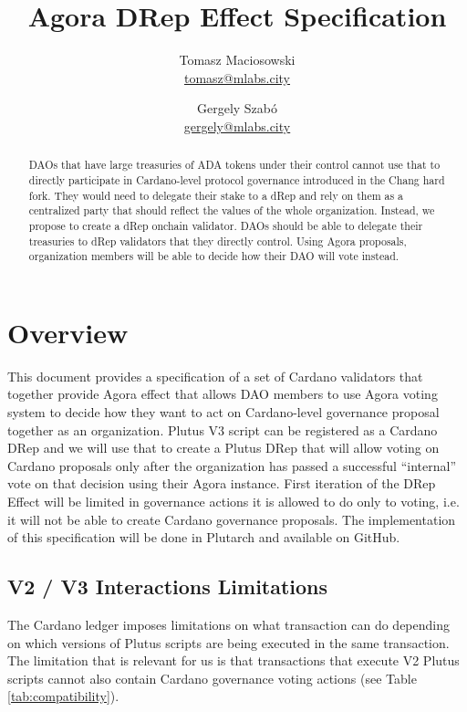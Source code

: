 \documentclass{article}
\begin{document}
\title{\textbf{Agora DRep Effect Specification}}
\author{
  Tomasz Maciosowski\\\href{mailto:tomasz@mlabs.city}{tomasz@mlabs.city} \and
  Gergely Szab\'o \\\href{mailto:gergely@mlabs.city}{gergely@mlabs.city}}
\date{}

\clearpage
\maketitle
\vskip 5mm
\begin{abstract}
  DAOs that have large treasuries of ADA tokens under their control cannot use that to directly participate in Cardano-level protocol governance introduced in the Chang hard fork.
  They would need to delegate their stake to a dRep and rely on them as a centralized party that should reflect the values of the whole organization.
  Instead, we propose to create a dRep onchain validator.
  DAOs should be able to delegate their treasuries to dRep validators that they directly control.
  Using Agora proposals, organization members will be able to decide how their DAO will vote instead.
\end{abstract}
\vskip 5mm
\section{Overview}

This document provides a specification of a set of Cardano validators that together provide Agora effect that
allows DAO members to use Agora voting system to decide how they want to act on Cardano-level governance proposal together as an organization.
Plutus V3 script can be registered as a Cardano DRep and we will use that to create a Plutus DRep that will allow voting on Cardano proposals only after the organization has passed a successful ``internal'' vote on that decision using their Agora instance.
First iteration of the DRep Effect will be limited in governance actions it is allowed to do only to voting, i.e. it will not be able to create Cardano governance proposals.
The implementation of this specification will be done in Plutarch and available on GitHub.

\subsection{V2 / V3 Interactions Limitations}

The Cardano ledger imposes limitations on what transaction can do depending on which versions of Plutus scripts are being executed in the same transaction.
The limitation that is relevant for us is that transactions that execute V2 Plutus scripts cannot also contain Cardano governance voting actions (see Table \ref{tab:compatibility}).
\end{document}
